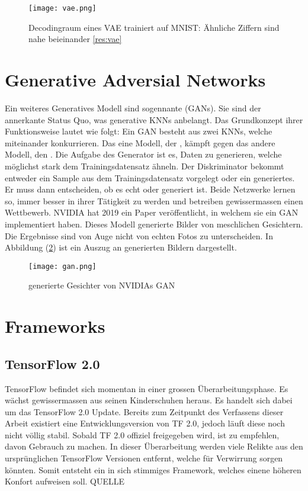 \begin{figure}[h!]
  \centering
  \texttt{[image: vae.png]}
  \caption{Decodingraum eines VAE trainiert auf MNIST: Ähnliche Ziffern sind
    nahe beieinander \ref{res:vae}}
  \label{fig:vae}
\end{figure}


\cite{wiki:autoencoder}

\section*{Generative Adversial Networks}
Ein weiteres Generatives Modell sind sogennante  (GANs). Sie sind der annerkante Status Quo, was generative KNNs
anbelangt.
\para{}
Das Grundkonzept ihrer Funktionsweise lautet wie folgt: Ein GAN besteht aus zwei
KNNs, welche miteinander konkurrieren. Das eine Modell, der
, kämpft gegen das andere Modell, den .
Die Aufgabe des Generator ist es, Daten zu generieren, welche möglichst stark
dem Trainingsdatensatz ähneln. Der Diskriminator bekommt entweder
ein Sample aus dem Trainingsdatensatz vorgelegt oder ein generiertes.
Er muss dann entscheiden, ob es echt oder generiert ist. Beide Netzwerke lernen so,
immer besser in ihrer Tätigkeit zu werden und betreiben gewissermassen einen Wettbewerb.
\para{}
NVIDIA hat 2019 ein Paper veröffentlicht, in welchem sie ein GAN implementiert
haben. Dieses Modell generierte Bilder von meschlichen Gesichtern. Die
Ergebnisse sind von Auge nicht von echten Fotos zu unterscheiden.
In Abbildung (\ref{fig:nvidia_gan}) ist ein Auszug an generierten Bildern dargestellt.

\begin{figure}[h!]
  \centering
  \texttt{[image: gan.png]}
  \caption{generierte Gesichter von NVIDIAs GAN \cite{res:gan}}
  \label{fig:nvidia_gan}
\end{figure}

\section*{Frameworks}
\subsection*{TensorFlow 2.0}
TensorFlow befindet sich momentan in einer grossen Überarbeitungsphase. Es
wächst gewissermassen aus seinen Kinderschuhen heraus. Es handelt sich dabei um das
TensorFlow 2.0 Update. Bereits zum Zeitpunkt des Verfassens dieser Arbeit
existiert eine Entwicklungsversion von TF 2.0, jedoch läuft diese noch nicht
völlig stabil. Sobald TF 2.0 offiziel freigegeben wird, ist zu empfehlen,
davon Gebrauch zu machen. In dieser Überarbeitung werden viele Relikte aus den
ursprünglichen TensorFlow Versionen entfernt, welche für Verwirrung sorgen
könnten. Somit entsteht ein in sich stimmiges Framework, welches einene höheren
Konfort aufweisen soll.
QUELLE

